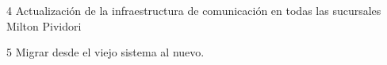 \begin{proyecto}
{4}
{Actualización de la infraestructura de comunicación en todas las sucursales}
{Milton Pividori}

  \begin{etapas}
  \end{etapas}

  \begin{recursos}
  \end{recursos}

\end{proyecto}


\begin{proyecto}
{5}
{Migrar desde el viejo sistema al nuevo.}
{}

  \begin{etapas}
    \etapa {}
  \end{etapas}

  \begin{recursos}
    \recurso {}
  \end{recursos}

  \tiempo {}
\end{proyecto}

